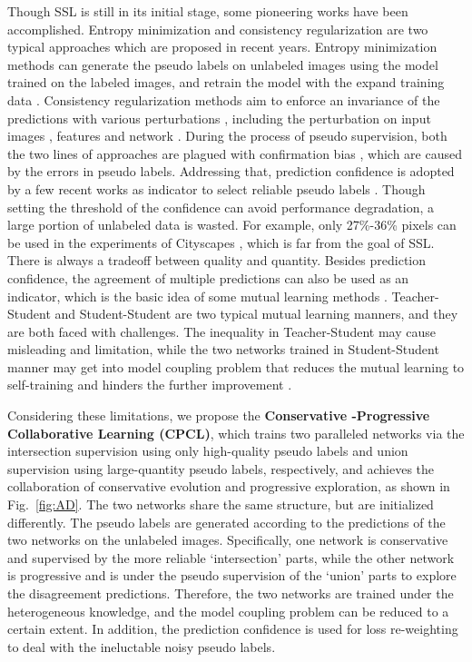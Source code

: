 \documentclass[journal]{IEEEtran}
\begin{document}
Though SSL is still in its initial stage, some pioneering works have been accomplished. Entropy minimization and consistency 
regularization are two typical approaches which are proposed in recent years. Entropy minimization methods can generate the pseudo labels on unlabeled images 
using the model trained on the labeled images, and retrain the model with the expand training data \cite{SSLEM,ALS4}. Consistency regularization methods aim 
to enforce an invariance of the predictions with various perturbations \cite{MT,VAT,9301261}, including the perturbation on input images \cite{2019Semi}, 
features \cite{CCT} and network \cite{DualStudent}. During the process of pseudo supervision, both the two lines of approaches are plagued with confirmation 
bias \cite{PLCB}, which are caused by the errors in pseudo labels. Addressing that, prediction confidence is adopted by a few recent works as indicator to 
select reliable pseudo labels \cite{ALS4,2021In}. Though setting the threshold of the confidence can avoid performance degradation, a large portion of 
unlabeled data is wasted. For example, only 27\%-36\% pixels can be used in the experiments of Cityscapes \cite{ALS4}, which is far from the goal of SSL. 
There is always a tradeoff between quality and quantity. Besides prediction confidence, the agreement of multiple predictions can also be used as an 
indicator, which is the basic idea of some mutual learning methods \cite{ke2019dual,qiao2018deep, 2020DMT}. Teacher-Student and Student-Student are two 
typical mutual learning manners, and they are both faced with challenges. The inequality in Teacher-Student may cause misleading and limitation, while the 
two networks trained in Student-Student manner may get into model coupling problem that reduces the mutual learning to self-training and hinders the further 
improvement \cite{RML}.

Considering these limitations, we propose the \textbf{Conservative -Progressive Collaborative Learning (CPCL)}, which trains two paralleled networks via the 
intersection supervision using only high-quality pseudo labels and union supervision using large-quantity pseudo labels, respectively, and achieves the 
collaboration of conservative evolution and progressive exploration, as shown in Fig.~\ref{fig:AD}. The two networks share the same structure, but are 
initialized differently. The pseudo labels are generated according to the predictions of the two networks on the unlabeled images. Specifically, one network 
is conservative and supervised by the more reliable `intersection' parts, while the other network is progressive and is under the pseudo supervision of the 
`union' parts to explore the disagreement predictions. Therefore, the two networks are trained under the heterogeneous knowledge, and the model coupling 
problem can be reduced to a certain extent. In addition, the prediction confidence is used for loss re-weighting to deal with the ineluctable noisy pseudo 
labels.
\end{document}
